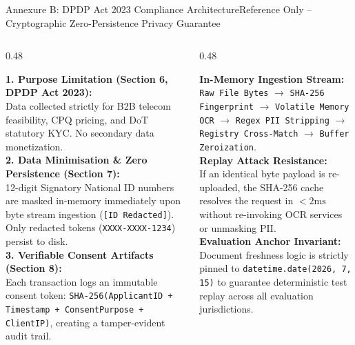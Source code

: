 \documentclass[aspectratio=169,10pt]{beamer}
\begin{document}
\begin{frame}{Annexure B: DPDP Act 2023 Compliance Architecture}{Reference Only -- Cryptographic Zero-Persistence Privacy Guarantee}
  \begin{columns}[T]
    \begin{column}{0.48\textwidth}
      \begin{tcolorbox}[academicbox, title={\fontsize{6.5pt}{7.8pt}\selectfont\textbf{Statutory DPDP Principles Implemented}}, coltitle=charcoal]
        {\fontsize{5.2pt}{6.4pt}\selectfont
        \textbf{1. Purpose Limitation (Section 6, DPDP Act 2023):} \\
        Data collected strictly for B2B telecom feasibility, CPQ pricing, and DoT statutory KYC. No secondary data monetization. \\[0.08cm]
        \textbf{2. Data Minimisation \& Zero Persistence (Section 7):} \\
        12-digit Signatory National ID numbers are masked in-memory immediately upon byte stream ingestion (\texttt{[ID Redacted]}). Only redacted tokens (\texttt{XXXX-XXXX-1234}) persist to disk. \\[0.08cm]
        \textbf{3. Verifiable Consent Artifacts (Section 8):} \\
        Each transaction logs an immutable consent token:
        \texttt{SHA-256(ApplicantID + Timestamp + ConsentPurpose + ClientIP)}, creating a tamper-evident audit trail.
        }
      \end{tcolorbox}
    \end{column}

    \begin{column}{0.48\textwidth}
      \begin{tcolorbox}[accentbox, title={\fontsize{6.5pt}{7.8pt}\selectfont\textbf{Cryptographic Verification Pipeline}}, coltitle=charcoal]
        {\fontsize{5.2pt}{6.4pt}\selectfont
        \textbf{In-Memory Ingestion Stream:} \\
        \texttt{Raw File Bytes} $\longrightarrow$ \texttt{SHA-256 Fingerprint} $\longrightarrow$ \texttt{Volatile Memory OCR} $\longrightarrow$ \texttt{Regex PII Stripping} $\longrightarrow$ \texttt{Registry Cross-Match} $\longrightarrow$ \texttt{Buffer Zeroization}. \\[0.08cm]
        \textbf{Replay Attack Resistance:} \\
        If an identical byte payload is re-uploaded, the SHA-256 cache resolves the request in $<2\text{ms}$ without re-invoking OCR services or unmasking PII. \\[0.08cm]
        \textbf{Evaluation Anchor Invariant:} \\
        Document freshness logic is strictly pinned to \texttt{datetime.date(2026, 7, 15)} to guarantee deterministic test replay across all evaluation jurisdictions.
        }
      \end{tcolorbox}
    \end{column}
  \end{columns}
\end{frame}
\end{document}

